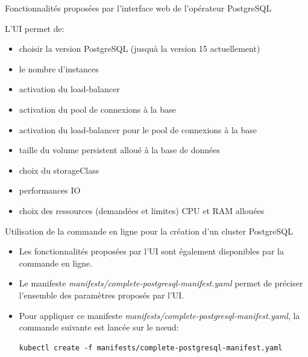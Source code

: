 \begin{frame}[fragile]{Fonctionnalités proposées par l'interface web de l'opérateur PostgreSQL}

L'UI permet de:
\begin{itemize}
   \item choisir la version PostgreSQL (jusquà la version 15 actuellement)
   \item le nombre d'instances
   \item activation du load-balancer
   \item activation du pool de connexions à la base
   \item activation du load-balancer pour le pool de connexions à la base
   \item taille du volume persistent alloué à la base de données
   \item choix du storageClass
   \item performances IO
   \item choix des ressources (demandées et limites) CPU et RAM allouées
\end{itemize}

\end{frame}


\begin{frame}[fragile]{Utilisation de la commande en ligne pour la création d'un cluster PostgreSQL}

   \begin{itemize}
      \item Les fonctionnalités proposées par l'UI sont également disponibles par la commande en ligne.
      \item Le manifeste \textit{manifests/complete-postgresql-manifest.yaml} permet de préciser l'ensemble des paramètres proposés par l'UI.
      \item Pour appliquer ce manifeste \textit{manifests/complete-postgresql-manifest.yaml}, la commande suivante est lancée sur le n\oe{}ud:
\begin{tiny}
\begin{Verbatim}[commandchars=\&\{\}]
kubectl create -f manifests/complete-postgresql-manifest.yaml
\end{Verbatim}
\end{tiny}
   \end{itemize}

\end{frame}


